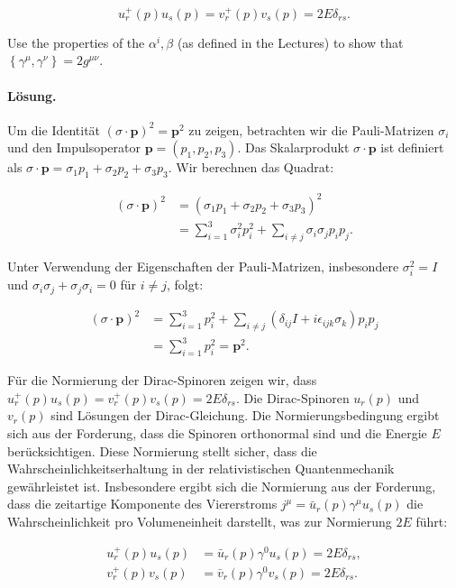\documentclass[11pt,a4paper]{article}
\begin{document}
$$
u_r^{+}(p) u_s(p)=v_r^{+}(p) v_s(p)=2 E \delta_{r s} .
$$


Use the properties of the $\alpha^i, \beta$ (as defined in the Lectures) to show that $\left\{\gamma^\mu, \gamma^\nu\right\}=2 g^{\mu \nu}$.

\paragraph{Lösung.}
Um die Identität $(\sigma \cdot \mathbf{p})^2 = \mathbf{p}^2$ zu zeigen, betrachten wir die Pauli-Matrizen $\sigma_i$ und den Impulsoperator $\mathbf{p} = (p_1, p_2, p_3)$. Das Skalarprodukt $\sigma \cdot \mathbf{p}$ ist definiert als $\sigma \cdot \mathbf{p} = \sigma_1 p_1 + \sigma_2 p_2 + \sigma_3 p_3$. Wir berechnen das Quadrat:

\begin{align*}
(\sigma \cdot \mathbf{p})^2 &= (\sigma_1 p_1 + \sigma_2 p_2 + \sigma_3 p_3)^2 \\
&= \sum_{i=1}^{3} \sigma_i^2 p_i^2 + \sum_{i \neq j} \sigma_i \sigma_j p_i p_j.
\end{align*}

Unter Verwendung der Eigenschaften der Pauli-Matrizen, insbesondere $\sigma_i^2 = I$ und $\sigma_i \sigma_j + \sigma_j \sigma_i = 0$ für $i \neq j$, folgt:

\begin{align*}
(\sigma \cdot \mathbf{p})^2 &= \sum_{i=1}^{3} p_i^2 + \sum_{i \neq j} (\delta_{ij} I + i \epsilon_{ijk} \sigma_k) p_i p_j \\
&= \sum_{i=1}^{3} p_i^2 = \mathbf{p}^2.
\end{align*}

Für die Normierung der Dirac-Spinoren zeigen wir, dass $u_r^{+}(p) u_s(p) = v_r^{+}(p) v_s(p) = 2 E \delta_{rs}$. Die Dirac-Spinoren $u_r(p)$ und $v_r(p)$ sind Lösungen der Dirac-Gleichung. Die Normierungsbedingung ergibt sich aus der Forderung, dass die Spinoren orthonormal sind und die Energie $E$ berücksichtigen. Diese Normierung stellt sicher, dass die Wahrscheinlichkeitserhaltung in der relativistischen Quantenmechanik gewährleistet ist. Insbesondere ergibt sich die Normierung aus der Forderung, dass die zeitartige Komponente des Viererstroms $j^\mu = \bar{u}_r(p) \gamma^\mu u_s(p)$ die Wahrscheinlichkeit pro Volumeneinheit darstellt, was zur Normierung $2E$ führt:

\begin{align*}
u_r^{+}(p) u_s(p) &= \bar{u}_r(p) \gamma^0 u_s(p) = 2 E \delta_{rs}, \\
v_r^{+}(p) v_s(p) &= \bar{v}_r(p) \gamma^0 v_s(p) = 2 E \delta_{rs}.
\end{align*}
\end{document}
